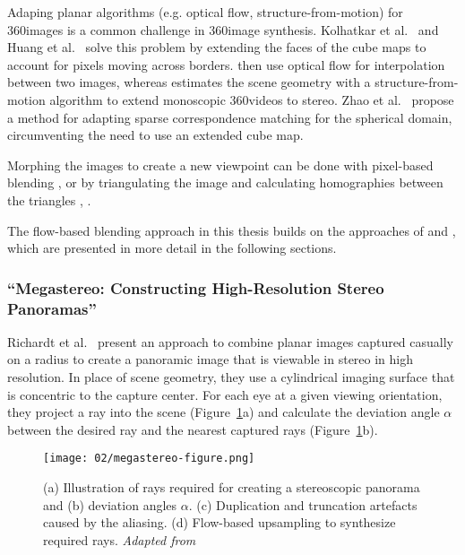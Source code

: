 Adaping planar algorithms (e.g. optical flow, structure-from-motion) for 360\degree images is a common challenge in 360\degree image synthesis. Kolhatkar et al.\ \cite{360flowblending} and Huang et al.\ \cite{6dof} solve this problem by extending the faces of the cube maps to account for pixels moving across borders. \cite{360flowblending} then use optical flow for interpolation between two images, whereas \cite{6dof} estimates the scene geometry with a structure-from-motion algorithm to extend monoscopic 360\degree videos to stereo. Zhao et al.\ \cite{cube2video} propose a method for adapting sparse correspondence matching for the spherical domain, circumventing the need to use an extended cube map.

Morphing the images to create a new viewpoint can be done with pixel-based blending \cite{megastereo}, \cite{360flowblending} or by triangulating the image and calculating homographies between the triangles \cite{6dof}, \cite{cube2video}.



The flow-based blending approach in this thesis builds on the approaches of \cite{megastereo} and \cite{360flowblending}, which are presented in more detail in the following sections.

\subsubsection{``Megastereo: Constructing High-Resolution Stereo Panoramas'' \cite{megastereo} \label{subsec:megastereo}}
Richardt et al.\ \cite{megastereo} present an approach to combine planar images captured casually on a radius to create a panoramic image that is viewable in stereo in high resolution. In place of scene geometry, they use a cylindrical imaging surface that is concentric to the capture center. For each eye at a given viewing orientation, they project a ray into the scene (Figure~\ref{fig:megastereo}a) and calculate the deviation angle $\alpha$ between the desired ray and the nearest captured rays (Figure~\ref{fig:megastereo}b). 

\begin{figure}[]
\centering
\texttt{[image: 02/megastereo-figure.png]}
\caption[Flow-based blending in Megastereo \cite{megastereo}]{(a) Illustration of rays required for creating a stereoscopic panorama and (b) deviation angles $\alpha$. (c) Duplication and truncation artefacts caused by the aliasing. (d) Flow-based upsampling to synthesize required rays. \emph{Adapted from \cite{megastereo}}}
\label{fig:megastereo}
\end{figure}


